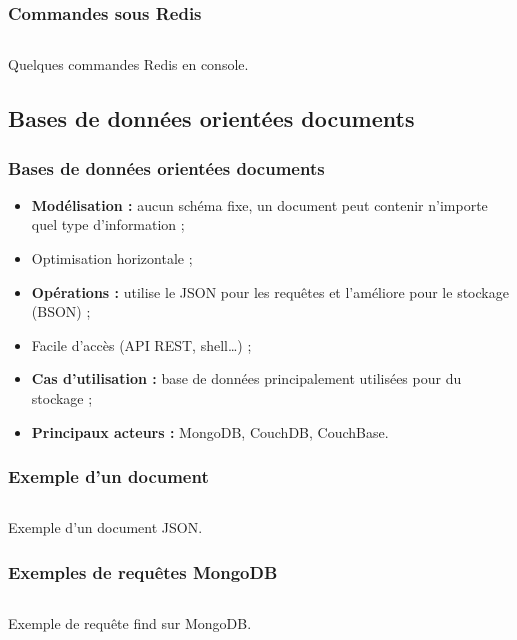     \begin{frame}
        \frametitle{Commandes sous Redis}

        \begin{listing}[H]
            \inputminted[fontsize=\tiny, linenos=true]{text}{code/commandesRedis.txt}
            \caption{Quelques commandes Redis en console.}
        \end{listing}
    \end{frame}

    \subsection{Bases de données orientées documents}
    \begin{frame}
        \frametitle{Bases de données orientées documents}

        \begin{itemize}
            \item \textbf{Modélisation :} aucun schéma fixe, un document peut contenir n'importe quel type d'information ;
            \item Optimisation horizontale ;
            \item \textbf{Opérations :} utilise le JSON pour les requêtes et l'améliore pour le stockage (BSON) ;
            \item Facile d'accès (API REST, shell\dots) ;
            \item \textbf{Cas d'utilisation :} base de données principalement utilisées pour du stockage ;
            \item \textbf{Principaux acteurs :} MongoDB, CouchDB, CouchBase.
        \end{itemize}
    \end{frame}

    \begin{frame}
        \frametitle{Exemple d'un document}

        \begin{listing}[H]
            \inputminted[fontsize=\tiny, linenos=true]{json}{code/exemple-document.json}
            \caption{Exemple d'un document JSON.}
        \end{listing}
    \end{frame}

    \begin{frame}
        \frametitle{Exemples de requêtes MongoDB}

        \begin{listing}[H]
            \inputminted{javascript}{code/requeteMongoFind.js}
            \caption{Exemple de requête find sur MongoDB.}
            \label{findMongoDB}
        \end{listing}
    \end{frame}

